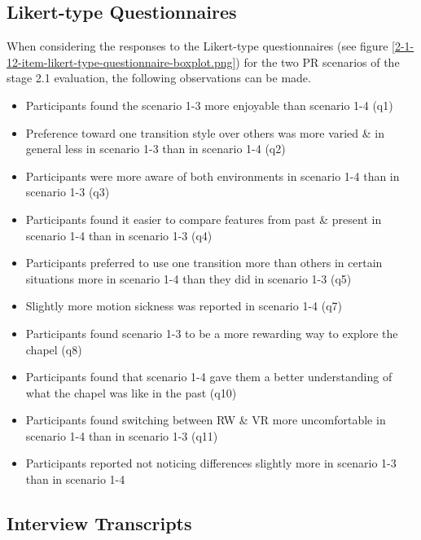 
\subsection{Likert-type Questionnaires}

When considering the responses to the Likert-type questionnaires (see figure \ref{2-1-12-item-likert-type-questionnaire-boxplot.png}) for the two PR scenarios of the stage 2.1 evaluation, the following observations can be made.

\begin{itemize}
	\item Participants found the scenario 1-3 more enjoyable than scenario 1-4 (q1)
	\item Preference toward one transition style over others was more varied \& in general less in scenario 1-3 than in scenario 1-4 (q2)
	\item Participants were more aware of both environments in scenario 1-4 than in scenario 1-3 (q3)
	\item Participants found it easier to compare features from past \& present in scenario 1-4 than in scenario 1-3 (q4)
	\item Participants preferred to use one transition more than others in certain situations more in scenario 1-4 than they did in scenario 1-3 (q5)
	\item Slightly more motion sickness was reported in scenario 1-4 (q7)
	\item Participants found scenario 1-3 to be a more rewarding way to explore the chapel (q8)
	\item Participants found that scenario 1-4 gave them a better understanding of what the chapel was like in the past (q10)
	\item Participants found switching between RW \& VR more uncomfortable in scenario 1-4 than in scenario 1-3 (q11)
	\item Participants reported not noticing differences slightly more in scenario 1-3 than in scenario 1-4
\end{itemize}


\subsection{Interview Transcripts}

